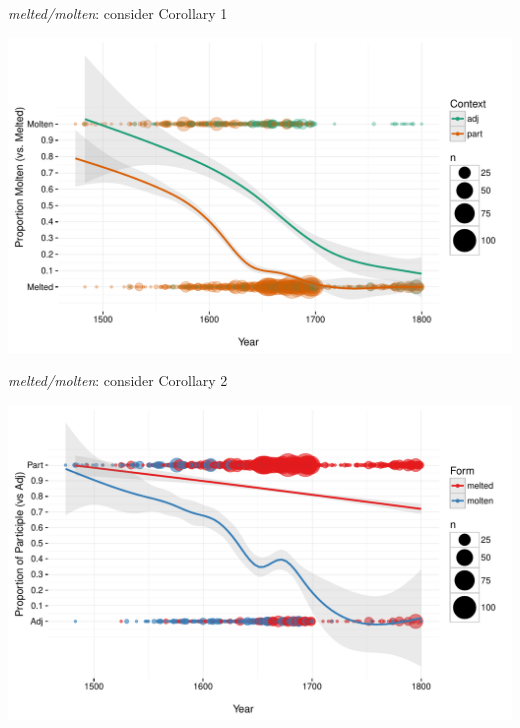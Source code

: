 \documentclass[hyperref={pdfpagelabels=false}]{beamer}
\begin{document}
\begin{frame}{\textsl{melted/molten}: consider Corollary 1}

\includegraphics[width=1.128\textwidth]{FormByDateUnbinnedWithDots2.pdf}
\end{frame}

\begin{frame}{\textsl{melted/molten}: consider Corollary 2}

\includegraphics[width=1.128\textwidth]{ContextByDateUnbinnedWithDots2.pdf}
\end{frame}
\end{document}
